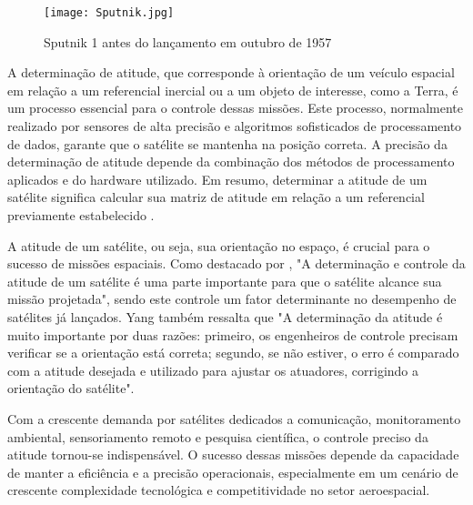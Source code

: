 \documentclass[
	12pt,				%
	openright,			%
	oneside,			%
	a4paper,			%
	english,			%
	brazil				%
	]{abntex2}
\begin{document}
\begin{figure}[h]
	\centering
	\texttt{[image: Sputnik.jpg]} %
	\caption[Sputnik 1 antes do lançamento em outubro de 1957]{Sputnik 1 antes do lançamento em outubro de 1957}
	\label{fig:sputnik}
\end{figure}

A determinação de atitude, que corresponde à orientação de um veículo espacial em relação a um referencial inercial ou a um objeto de interesse, como a Terra, é um processo essencial para o controle dessas missões. Este processo, normalmente realizado por sensores de alta precisão e algoritmos sofisticados de processamento de dados, garante que o satélite se mantenha na posição correta. A precisão da determinação de atitude depende da combinação dos métodos de processamento aplicados e do hardware utilizado. Em resumo, determinar a atitude de um satélite significa calcular sua matriz de atitude em relação a um referencial previamente estabelecido \cite{Wertz2012}.

A atitude de um satélite, ou seja, sua orientação no espaço, é crucial para o sucesso de missões espaciais. Como destacado por \cite{YANG2012198}, "A determinação e controle da atitude de um satélite é uma parte importante para que o satélite alcance sua missão projetada", sendo este controle um fator determinante no desempenho de satélites já lançados. Yang também ressalta que "A determinação da atitude é muito importante por duas razões: primeiro, os engenheiros de controle precisam verificar se a orientação está correta; segundo, se não estiver, o erro é comparado com a atitude desejada e utilizado para ajustar os atuadores, corrigindo a orientação do satélite".

Com a crescente demanda por satélites dedicados a comunicação, monitoramento ambiental, sensoriamento remoto e pesquisa científica, o controle preciso da atitude tornou-se indispensável. O sucesso dessas missões depende da capacidade de manter a eficiência e a precisão operacionais, especialmente em um cenário de crescente complexidade tecnológica e competitividade no setor aeroespacial.
\end{document}
